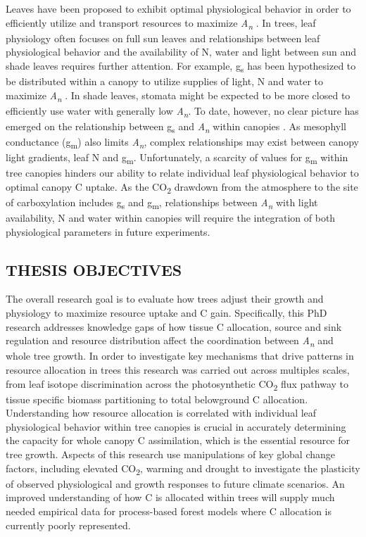 \documentclass[a4paper]{article}\usepackage[]{graphicx}\usepackage[]{color}
\begin{document}
Leaves have been proposed to exhibit optimal physiological behavior in order to efficiently utilize and transport resources to maximize \textit{A\textsubscript{n}} \citep{thornley1972model}. In trees, leaf physiology often focuses on full sun leaves and relationships between leaf physiological behavior and the availability of N, water and light between sun and shade leaves requires further attention. For example, g\textsubscript{s} has been hypothesized to be distributed within a canopy to utilize supplies of light, N and water to maximize \textit{A\textsubscript{n}} \citep{peltoniemi2012co}. In shade leaves, stomata might be expected to be more closed to efficiently use water with generally low \textit{A\textsubscript{n}}. To date, however, no clear picture has emerged on the relationship between g\textsubscript{s} and \textit{A\textsubscript{n}} within canopies \citep[see]{jifon2003moderate, tissue2006spatial, sellin2010variation}. As mesophyll conductance (g\textsubscript{m}) also limits \textit{A\textsubscript{n}}, complex relationships may exist between canopy light gradients, leaf N and g\textsubscript{m}. Unfortunately, a scarcity of values for g\textsubscript{m} within tree canopies \citep[see]{lloyd1992low, warren2003transfer, piel2002effect, warren2007internal} hinders our ability to relate individual leaf physiological behavior to optimal canopy C uptake. As the CO\textsubscript{2} drawdown from the atmosphere to the site of carboxylation includes g\textsubscript{s} and g\textsubscript{m}, relationships between \textit{A\textsubscript{n}} with light availability, N and water within canopies will require the integration of both physiological parameters in future experiments.

\subsection*{THESIS OBJECTIVES}
The overall research goal is to evaluate how trees adjust their growth and physiology to maximize resource uptake and C gain. Specifically, this PhD research addresses knowledge gaps of how tissue C allocation, source and sink regulation and resource distribution affect the coordination between \textit{A\textsubscript{n}} and whole tree growth. In order to investigate key mechanisms that drive patterns in resource allocation in trees this research was carried out across multiples scales, from leaf isotope discrimination across the photosynthetic CO\textsubscript{2} flux pathway to tissue specific biomass partitioning to total belowground C allocation. Understanding how resource allocation is correlated with individual leaf physiological behavior within tree canopies is crucial in accurately determining the capacity for whole canopy C assimilation, which is the essential resource for tree growth. Aspects of this research use manipulations of key global change factors, including elevated CO\textsubscript{2}, warming and drought to investigate the plasticity of observed physiological and growth responses to future climate scenarios. An improved understanding of how C is allocated within trees will supply much needed empirical data for process-based forest models where C allocation is currently poorly represented. 
\end{document}
